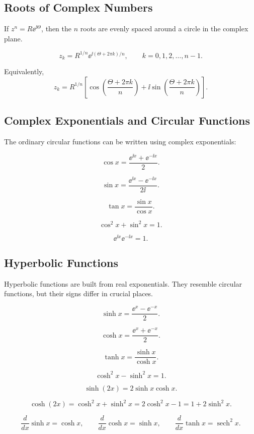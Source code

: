 \documentclass{otscience}
\begin{document}
\subsection{Roots of Complex Numbers}

If \(z^n=R\ee^{\ii\Theta}\), then the \(n\) roots are evenly spaced around a circle in the complex plane.

\begin{formulaboxnosplit}
\[
z_k=R^{1/n}\ee^{\ii(\Theta+2\pi k)/n},
\qquad k=0,1,2,\dots,n-1.
\]

Equivalently,
\[
z_k=R^{1/n}\left[\cos\left(\frac{\Theta+2\pi k}{n}\right)+\ii\sin\left(\frac{\Theta+2\pi k}{n}\right)\right].
\]
\end{formulaboxnosplit}

\subsection{Complex Exponentials and Circular Functions}

The ordinary circular functions can be written using complex exponentials:

\begin{formulabox}
\[
\cos x=\frac{\ee^{\ii x}+\ee^{-\ii x}}{2}.
\]

\[
\sin x=\frac{\ee^{\ii x}-\ee^{-\ii x}}{2\ii}.
\]

\[
\tan x=\frac{\sin x}{\cos x}.
\]

\[
\cos^2x+\sin^2x=1.
\]

\[
\ee^{\ii x}\ee^{-\ii x}=1.
\]
\end{formulabox}

\subsection{Hyperbolic Functions}

Hyperbolic functions are built from real exponentials. They resemble circular functions, but their signs differ in crucial places.

\begin{formulabox}
\[
\sinh x=\frac{\ee^x-\ee^{-x}}{2}.
\]

\[
\cosh x=\frac{\ee^x+\ee^{-x}}{2}.
\]

\[
\tanh x=\frac{\sinh x}{\cosh x}.
\]

\[
\cosh^2x-\sinh^2x=1.
\]

\[
\sinh(2x)=2\sinh x\cosh x.
\]

\[
\cosh(2x)=\cosh^2x+\sinh^2x=2\cosh^2x-1=1+2\sinh^2x.
\]

\[
\frac{d}{dx}\sinh x=\cosh x,
\qquad
\frac{d}{dx}\cosh x=\sinh x,
\qquad
\frac{d}{dx}\tanh x=\operatorname{sech}^2x.
\]
\end{formulabox}
\end{document}
